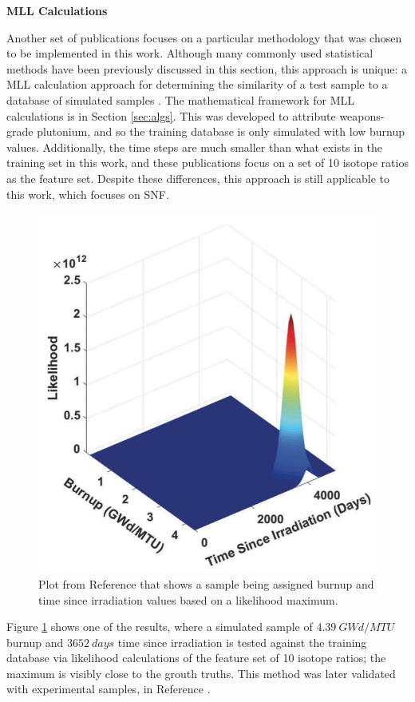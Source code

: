 \noindent \textbf{MLL Calculations}

Another set of publications focuses on a particular methodology that was chosen
to be implemented in this work. Although many commonly used statistical methods
have been previously discussed in this section, this approach is unique: a
\gls{MLL} calculation approach for determining the similarity of a test sample
to a database of simulated samples \cite{mll_method}.  The mathematical
framework for \gls{MLL} calculations is in Section \ref{sec:algs}.  This was
developed to attribute weapons-grade plutonium, and so the training database is
only simulated with low burnup values.  Additionally, the time steps are much
smaller than what exists in the training set in this work, and these
publications focus on a set of 10 isotope ratios as the feature set.  Despite
these differences, this approach is still applicable to this work, which
focuses on \gls{SNF}. 

\begin{figure}[!htb]
  \centering
  \includegraphics[width=0.6\linewidth]{./chapters/litrev/tamu.png}
  \caption{Plot from Reference \cite{mll_method} that shows a sample being 
           assigned burnup and time since irradiation values based on a 
           likelihood maximum.}
  \label{fig:tamu}
\end{figure}

Figure \ref{fig:tamu} shows one of the results, where a simulated sample of
$4.39\:GWd/MTU$ burnup and $3652\:days$ time since irradiation is tested
against the training database via likelihood calculations of the feature set of
10 isotope ratios; the maximum is visibly close to the grouth truths.  This
method was later validated with experimental samples, in Reference
\cite{mll_validate}. 

